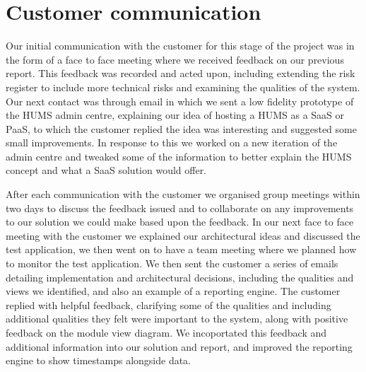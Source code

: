 \section{Customer communication}
\label{sec:communication}

Our initial communication with the customer for this stage of the project was in the form of a face to face meeting where we received feedback on our previous report. This feedback was recorded and acted upon, including extending the risk register to include more technical risks and examining the qualities of the system. Our next contact was through email in which we sent a low fidelity prototype of the HUMS admin centre, explaining our idea of hosting a HUMS as a SaaS or PaaS, to which the customer replied the idea was interesting and suggested some small improvements. In response to this we worked on a new iteration of the admin centre and tweaked some of the information to better explain the HUMS concept and what a SaaS solution would offer.

After each communication with the customer we organised group meetings within two days to discuss the feedback issued and to collaborate on any improvements to our solution we could make based upon the feedback. In our next face to face meeting with the customer we explained our architectural ideas and discussed the test application, we then went on to have a team meeting where we planned how to monitor the test application. We then sent the customer a series of emails detailing implementation and architectural decisions, including the qualities and views we identified, and also an example of a reporting engine. The customer replied with helpful feedback, clarifying some of the qualities and including additional qualities they felt were important to the system, along with positive feedback on the module view diagram. We incoportated this feedback and additional information into our solution and report, and improved the reporting engine to show timestamps alongside data.
